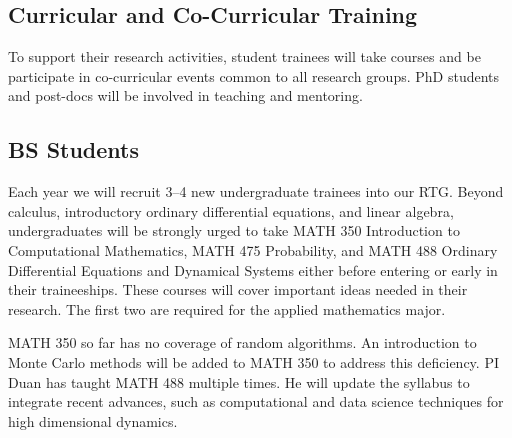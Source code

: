 \documentclass[11pt]{NSFamsart}
\newcommand{\FredNote}[1]{{\color{blue} Fred: #1}}
\begin{document}




\subsection{Curricular and Co-Curricular Training}
To support their research activities, student trainees will take courses and be participate in co-curricular events common to all research groups.  PhD students and post-docs will be involved in teaching and mentoring. 

\subsection*{BS Students} 

Each year we will recruit 3--4 new undergraduate trainees into our RTG.
Beyond calculus, introductory ordinary differential equations, and linear algebra, undergraduates will be strongly urged to take MATH 350 Introduction to Computational Mathematics, MATH 475 Probability, and MATH 488 Ordinary Differential Equations and Dynamical Systems either before entering or early in their traineeships.  These courses will cover important ideas needed in their research.  The first two are required for the applied mathematics major.  

MATH 350 so far has no coverage of random algorithms. An introduction to Monte Carlo methods will be added to MATH 350 to address this deficiency.
PI Duan has taught MATH 488 multiple  times.  He will update the syllabus to integrate recent advances, such as computational and data science techniques for high dimensional dynamics. 
\end{document}
